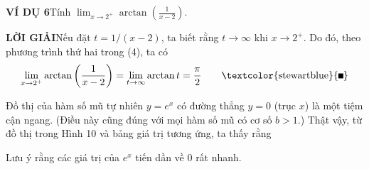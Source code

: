 \noindent
\textcolor{stewartblue}{\textsf{\textbf{VÍ DỤ 6}}}\quad Tính $\displaystyle \lim_{x \to 2^+} \arctan\left(\frac{1}{x - 2}\right)$.

\vspace{0.8ex}
\noindent
\textcolor{stewartblue}{\textsf{\textbf{LỜI GIẢI}}}\quad Nếu đặt $t = 1/(x - 2)$, ta biết rằng $t \to \infty$ khi $x \to 2^+$. Do đó, theo phương trình thứ hai trong (4), ta có
\[
\lim_{x \to 2^+} \arctan\left(\frac{1}{x - 2}\right) = \lim_{t \to \infty} \arctan t = \frac{\pi}{2} \tag*{\textcolor{stewartblue}{\rule{1.15ex}{1.15ex}}}
\]

\noindent
Đồ thị của hàm số mũ tự nhiên $y = e^x$ có đường thẳng $y = 0$ (trục $x$) là một tiệm cận ngang. (Điều này cũng đúng với mọi hàm số mũ có cơ số $b > 1$.) Thật vậy, từ đồ thị trong Hình 10 và bảng giá trị tương ứng, ta thấy rằng

\begin{center}
\end{center}

\noindent
Lưu ý rằng các giá trị của $e^x$ tiến dần về $0$ rất nhanh.

